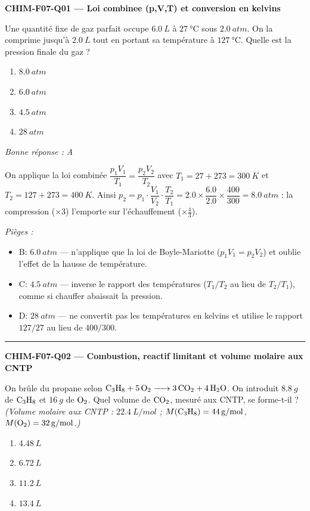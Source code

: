 \documentclass[11pt,a4paper]{article}
\begin{document}
\noindent\textbf{CHIM-F07-Q01 --- Loi combinee (p,V,T) et conversion en kelvins}\par
Une quantité fixe de gaz parfait occupe $\qty{6.0}{L}$ à $\qty{27}{\degreeCelsius}$ sous $\qty{2.0}{atm}$. On la comprime jusqu'à $\qty{2.0}{L}$ tout en portant sa température à $\qty{127}{\degreeCelsius}$. Quelle est la pression finale du gaz ?
\begin{enumerate}[label=\Alph*)]
\item $\qty{8.0}{atm}$
\item $\qty{6.0}{atm}$
\item $\qty{4.5}{atm}$
\item $\qty{28}{atm}$
\end{enumerate}
\textit{Bonne réponse : A}\par
On applique la loi combinée $\dfrac{p_1V_1}{T_1}=\dfrac{p_2V_2}{T_2}$ avec $T_1=27+273=\qty{300}{K}$ et $T_2=127+273=\qty{400}{K}$. Ainsi $p_2=p_1\cdot\dfrac{V_1}{V_2}\cdot\dfrac{T_2}{T_1}=\num{2.0}\times\dfrac{6.0}{2.0}\times\dfrac{400}{300}=\qty{8.0}{atm}$ : la compression ($\times 3$) l'emporte sur l'échauffement ($\times\tfrac{4}{3}$).\par
\textit{Pièges :}
\begin{itemize}
\item B: $\qty{6.0}{atm}$ --- n'applique que la loi de Boyle-Mariotte ($p_1V_1=p_2V_2$) et oublie l'effet de la hausse de température.
\item C: $\qty{4.5}{atm}$ --- inverse le rapport des températures ($T_1/T_2$ au lieu de $T_2/T_1$), comme si chauffer abaissait la pression.
\item D: $\qty{28}{atm}$ --- ne convertit pas les températures en kelvins et utilise le rapport $127/27$ au lieu de $400/300$.
\end{itemize}
\vspace{8pt}\hrule\vspace{8pt}
\noindent\textbf{CHIM-F07-Q02 --- Combustion, reactif limitant et volume molaire aux CNTP}\par
On brûle du propane selon $\ce{C3H8 + 5O2 -> 3CO2 + 4H2O}$. On introduit $\qty{8.8}{g}$ de $\ce{C3H8}$ et $\qty{16}{g}$ de $\ce{O2}$. Quel volume de $\ce{CO2}$, mesuré aux CNTP, se forme-t-il ? \textit{(Volume molaire aux CNTP : $\qty{22.4}{L/mol}$ ; $M(\ce{C3H8})=\qty{44}{g/mol}$, $M(\ce{O2})=\qty{32}{g/mol}$.)}
\begin{enumerate}[label=\Alph*)]
\item $\qty{4.48}{L}$
\item $\qty{6.72}{L}$
\item $\qty{11.2}{L}$
\item $\qty{13.4}{L}$
\end{enumerate}
\end{document}
